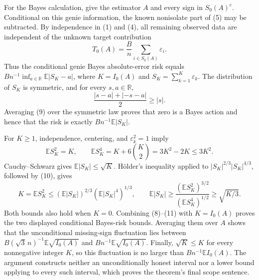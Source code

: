 For the Bayes calculation, give the estimator \(A\) and every sign in \(S_0(A)^c\).  Conditional on this genie information, the known nonisolate part of (5) may be subtracted.  By independence in (1) and (4), all remaining observed data are independent of the unknown target contribution
\[
 T_0(A)=\frac{B}{n}\sum_{i\in S_0(A)}\varepsilon_i.
 \tag{8}
\]
Thus the conditional genie Bayes absolute-error risk equals \(B n^{-1}\inf_{a\in\mathbb R}\mathbb E|S_K-a|\), where \(K=I_0(A)\) and \(S_K=\sum_{k=1}^K\varepsilon_k\).  The distribution of \(S_K\) is symmetric, and for every \(s,a\in\mathbb R\),
\[
 \frac{|s-a|+|-s-a|}{2}\ge |s|.
 \tag{9}
\]
Averaging (9) over the symmetric law proves that zero is a Bayes action and hence that the risk is exactly \(Bn^{-1}\mathbb E|S_K|\).

For \(K\ge1\), independence, centering, and \(\varepsilon_k^2=1\) imply
\[
 \mathbb E S_K^2=K,
 \qquad
 \mathbb E S_K^4=K+6{K\choose2}=3K^2-2K\le3K^2.
 \tag{10}
\]
Cauchy--Schwarz gives \(\mathbb E|S_K|\le\sqrt K\).  H\"older's inequality applied to \(|S_K|^{2/3}|S_K|^{4/3}\), followed by (10), gives
\[
 K=\mathbb E S_K^2
 \le (\mathbb E|S_K|)^{2/3}(\mathbb E|S_K|^4)^{1/3},
 \qquad
 \mathbb E|S_K|
 \ge \frac{(\mathbb E S_K^2)^{3/2}}{(\mathbb E S_K^4)^{1/2}}
 \ge\sqrt{K/3}.
 \tag{11}
\]
Both bounds also hold when \(K=0\).  Combining (8)--(11) with \(K=I_0(A)\) proves the two displayed conditional Bayes-risk bounds.  Averaging them over \(A\) shows that the unconditional missing-sign fluctuation lies between \(B(\sqrt3\,n)^{-1}\mathbb E\sqrt{I_0(A)}\) and \(Bn^{-1}\mathbb E\sqrt{I_0(A)}\).  Finally, \(\sqrt K\le K\) for every nonnegative integer \(K\), so this fluctuation is no larger than \(Bn^{-1}\mathbb E I_0(A)\).  The argument constructs neither an unconditionally honest interval nor a lower bound applying to every such interval, which proves the theorem's final scope sentence.